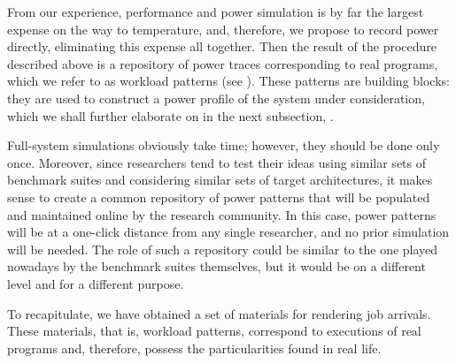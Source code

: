 From our experience, performance and power simulation is by far the largest
expense on the way to temperature, and, therefore, we propose to record power
directly, eliminating this expense all together. Then the result of the
procedure described above is a repository of power traces corresponding to real
programs, which we refer to as workload patterns (see ). These
patterns are building blocks: they are used to construct a power profile of the
system under consideration, which we shall further elaborate on in the next
subsection, .

Full-system simulations obviously take time; however, they should be done only
once. Moreover, since researchers tend to test their ideas using similar sets of
benchmark suites and considering similar sets of target architectures, it makes
sense to create a common repository of power patterns that will be populated and
maintained online by the research community. In this case, power patterns will
be at a one-click distance from any single researcher, and no prior simulation
will be needed. The role of such a repository could be similar to the one played
nowadays by the benchmark suites themselves, but it would be on a different
level and for a different purpose.

To recapitulate, we have obtained a set of materials for rendering job arrivals.
These materials, that is, workload patterns, correspond to executions of real
programs and, therefore, possess the particularities found in real life.
